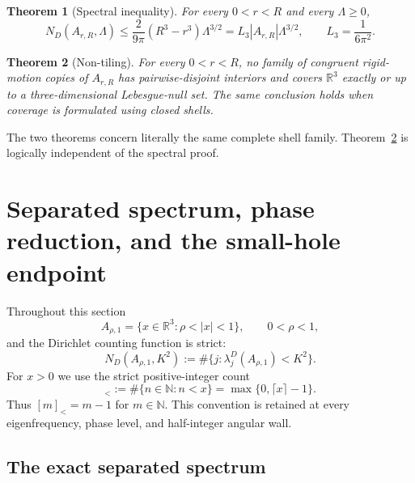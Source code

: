 \documentclass[11pt]{article}
\numberwithin{equation}{section}
\newtheorem{theorem}{Theorem}[section]
\theoremstyle{definition}
\theoremstyle{remark}
\newcommand{\R}{\mathbb R}
\begin{document}
\begin{theorem}[Spectral inequality]
\label{thm:spectral}
For every \(0<r<R\) and every \(\Lambda\ge0\),
\begin{equation}
  \boxed{
  N_D(A_{r,R},\Lambda)
  \le \frac{2}{9\pi}(R^3-r^3)\Lambda^{3/2}
  =L_3|A_{r,R}|\Lambda^{3/2},
  \qquad L_3=\frac1{6\pi^2}.}
  \label{eq:main-theorem}
\end{equation}
\end{theorem}

\begin{theorem}[Non-tiling]
\label{thm:nontiling}
For every \(0<r<R\), no family of congruent rigid-motion copies of
\(A_{r,R}\) has pairwise-disjoint interiors and covers \(\R^3\) exactly or
up to a three-dimensional Lebesgue-null set.  The same conclusion holds when
coverage is formulated using closed shells.
\end{theorem}

The two theorems concern literally the same complete shell family.
Theorem~\ref{thm:nontiling} is logically independent of the spectral proof.


\section{Separated spectrum, phase reduction, and the small-hole endpoint}
\label{sec:sc-spectrum-small-hole}

Throughout this section
\[
  A_{\rho,1}=\{x\in\mathbb R^3:\rho<|x|<1\},
  \qquad 0<\rho<1,
\]
and the Dirichlet counting function is strict:
\[
  N_D(A_{\rho,1},K^2)
  :=\#\{j:\lambda_j^D(A_{\rho,1})<K^2\}.
\]
For \(x>0\) we use the strict positive-integer count
\begin{equation}
  [x]_<:=\#\{n\in\mathbb N:n<x\}
  =\max\{0,\lceil x\rceil-1\}.
  \label{eq:sc-strict-bracket}
\end{equation}
Thus \([m]_< =m-1\) for \(m\in\mathbb N\).  This convention is retained
at every eigenfrequency, phase level, and half-integer angular wall.

\subsection{The exact separated spectrum}
\end{document}
